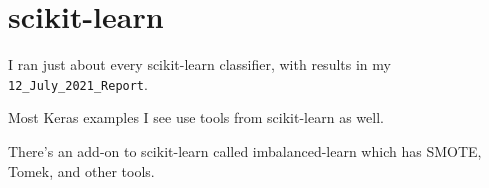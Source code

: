 \section{scikit-learn}

I ran just about every scikit-learn classifier, with results in my \verb|12_July_2021_Report|.  

Most Keras examples I see use tools from scikit-learn as well. 

There's an add-on to scikit-learn called imbalanced-learn which has SMOTE, Tomek, and other tools.  

